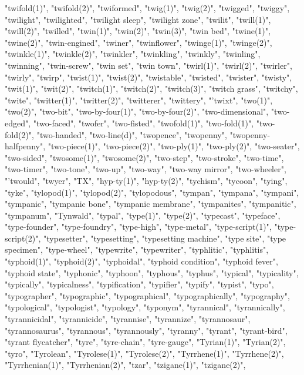 "twifold(1)",
"twifold(2)",
"twiformed",
"twig(1)",
"twig(2)",
"twigged",
"twiggy",
"twilight",
"twilighted",
"twilight sleep",
"twilight zone",
"twilit",
"twill(1)",
"twill(2)",
"twilled",
"twin(1)",
"twin(2)",
"twin(3)",
"twin bed",
"twine(1)",
"twine(2)",
"twin-engined",
"twiner",
"twinflower",
"twinge(1)",
"twinge(2)",
"twinkle(1)",
"twinkle(2)",
"twinkler",
"twinkling",
"twinkly",
"twinling",
"twinning",
"twin-screw",
"twin set",
"twin town",
"twirl(1)",
"twirl(2)",
"twirler",
"twirly",
"twirp",
"twist(1)",
"twist(2)",
"twistable",
"twisted",
"twister",
"twisty",
"twit(1)",
"twit(2)",
"twitch(1)",
"twitch(2)",
"twitch(3)",
"twitch grass",
"twitchy",
"twite",
"twitter(1)",
"twitter(2)",
"twitterer",
"twittery",
"'twixt",
"two(1)",
"two(2)",
"two-bit",
"two-by-four(1)",
"two-by-four(2)",
"two-dimensional",
"two-edged",
"two-faced",
"twofer",
"two-fisted",
"twofold(1)",
"two-fold(1)",
"two-fold(2)",
"two-handed",
"two-line(d)",
"twopence",
"twopenny",
"twopenny-halfpenny",
"two-piece(1)",
"two-piece(2)",
"two-ply(1)",
"two-ply(2)",
"two-seater",
"two-sided",
"twosome(1)",
"twosome(2)",
"two-step",
"two-stroke",
"two-time",
"two-timer",
"two-tone",
"two-up",
"two-way",
"two-way mirror",
"two-wheeler",
"'twould",
"twyer",
"TX",
"hyp-ty(1)",
"hyp-ty(2)",
"tychism",
"tycoon",
"tying",
"tyke",
"tylopod(1)",
"tylopod(2)",
"tylopodous",
"tympan",
"tympana",
"tympani",
"tympanic",
"tympanic bone",
"tympanic membrane",
"tympanites",
"tympanitic",
"tympanum",
"Tynwald",
"typal",
"type(1)",
"type(2)",
"typecast",
"typeface",
"type-founder",
"type-foundry",
"type-high",
"type-metal",
"type-script(1)",
"type-script(2)",
"typesetter",
"typesetting",
"typesetting machine",
"type site",
"type specimen",
"type-wheel",
"typewrite",
"typewriter",
"typhlitic",
"typhlitis",
"typhoid(1)",
"typhoid(2)",
"typhoidal",
"typhoid condition",
"typhoid fever",
"typhoid state",
"typhonic",
"typhoon",
"typhous",
"typhus",
"typical",
"typicality",
"typically",
"typicalness",
"typification",
"typifier",
"typify",
"typist",
"typo",
"typographer",
"typographic",
"typographical",
"typographically",
"typography",
"typological",
"typologist",
"typology",
"typonym",
"tyrannical",
"tyrannically",
"tyrannicidal",
"tyrannicide",
"tyrannise",
"tyrannize",
"tyrannosaur",
"tyrannosaurus",
"tyrannous",
"tyrannously",
"tyranny",
"tyrant",
"tyrant-bird",
"tyrant flycatcher",
"tyre",
"tyre-chain",
"tyre-gauge",
"Tyrian(1)",
"Tyrian(2)",
"tyro",
"Tyrolean",
"Tyrolese(1)",
"Tyrolese(2)",
"Tyrrhene(1)",
"Tyrrhene(2)",
"Tyrrhenian(1)",
"Tyrrhenian(2)",
"tzar",
"tzigane(1)",
"tzigane(2)",
